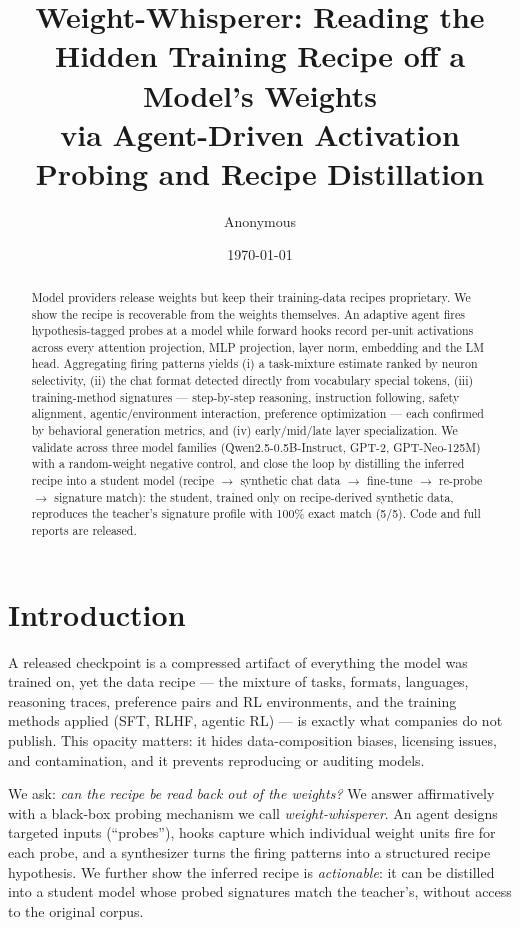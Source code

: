 \documentclass[11pt]{article}
\title{Weight-Whisperer: Reading the Hidden Training Recipe off a Model's Weights\\via Agent-Driven Activation Probing and Recipe Distillation}
\author{Anonymous}
\date{\today}
\begin{document}
\maketitle

\begin{abstract}
Model providers release weights but keep their training-data recipes proprietary.
We show the recipe is recoverable from the weights themselves. An adaptive agent
fires hypothesis-tagged probes at a model while forward hooks record per-unit
activations across every attention projection, MLP projection, layer norm, embedding
and the LM head. Aggregating firing patterns yields (i) a task-mixture estimate ranked
by neuron selectivity, (ii) the chat format detected directly from vocabulary special
tokens, (iii) training-method signatures --- step-by-step reasoning, instruction
following, safety alignment, agentic/environment interaction, preference optimization
--- each confirmed by behavioral generation metrics, and (iv) early/mid/late layer
specialization. We validate across three model families (Qwen2.5-0.5B-Instruct, GPT-2,
GPT-Neo-125M) with a random-weight negative control, and close the loop by distilling
the inferred recipe into a student model (recipe $\to$ synthetic chat data $\to$
fine-tune $\to$ re-probe $\to$ signature match): the student, trained only on
recipe-derived synthetic data, reproduces the teacher's signature profile with 100\%
exact match (5/5). Code and full reports are released.
\end{abstract}

\section{Introduction}
A released checkpoint is a compressed artifact of everything the model was trained
on, yet the data recipe --- the mixture of tasks, formats, languages, reasoning traces,
preference pairs and RL environments, and the training methods applied (SFT, RLHF,
agentic RL) --- is exactly what companies do not publish. This opacity matters: it
hides data-composition biases, licensing issues, and contamination, and it prevents
reproducing or auditing models.

We ask: \emph{can the recipe be read back out of the weights?} We answer affirmatively
with a black-box probing mechanism we call \emph{weight-whisperer}. An agent designs
targeted inputs (``probes''), hooks capture which individual weight units fire for each
probe, and a synthesizer turns the firing patterns into a structured recipe hypothesis.
We further show the inferred recipe is \emph{actionable}: it can be distilled into a
student model whose probed signatures match the teacher's, without access to the
original corpus.
\end{document}
